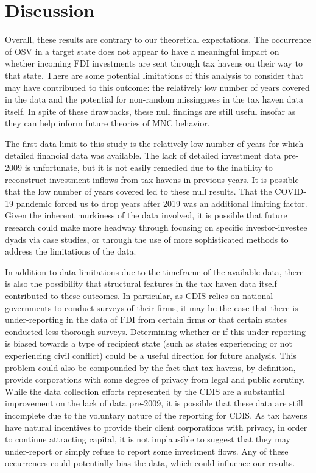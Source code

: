 \documentclass[11pt, titlepage]{article} %
\begin{document}
\section*{Discussion}

Overall, these results are contrary to our theoretical expectations. The occurrence of OSV in a target state does not appear to have a meaningful impact on whether incoming FDI investments are sent through tax havens on their way to that state. There are some potential limitations of this analysis to consider that may have contributed to this outcome: the relatively low number of years covered in the data and the potential for non-random missingness in the tax haven data itself. In spite of these drawbacks, these null findings are still useful insofar as they can help inform future theories of MNC behavior.

The first data limit to this study is the relatively low number of years for which detailed financial data was available. The lack of detailed investment data pre-2009 is unfortunate, but it is not easily remedied due to the inability to reconstruct investment inflows from tax havens in previous years. It is possible that the low number of years covered led to these null results. That the COVID-19 pandemic forced us to drop years after 2019 was an additional limiting factor. Given the inherent murkiness of the data involved, it is possible that future research could make more headway through focusing on specific investor-investee dyads via case studies, or through the use of more sophisticated methods to address the limitations of the data.

In addition to data limitations due to the timeframe of the available data, there is also the possibility that structural features in the tax haven data itself contributed to these outcomes. In particular, as CDIS relies on national governments to conduct surveys of their firms, it may be the case that there is under-reporting in the data of FDI from certain firms or that certain states conducted less thorough surveys. Determining whether or if this under-reporting is biased towards a type of recipient state (such as states experiencing or not experiencing civil conflict) could be a useful direction for future analysis. This problem could also be compounded by the fact that tax havens, by definition, provide corporations with some degree of privacy from legal and public scrutiny. While the data collection efforts represented by the CDIS are a substantial improvement on the lack of data pre-2009, it is possible that these data are still incomplete due to the voluntary nature of the reporting for CDIS. As tax havens have natural incentives to provide their client corporations with privacy, in order to continue attracting capital, it is not implausible to suggest that they may under-report or simply refuse to report some investment flows. Any of these occurrences could potentially bias the data, which could influence our results.
\end{document}
